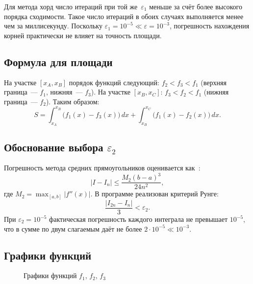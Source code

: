 \documentclass[a4paper,12pt,titlepage,finall]{article}
\begin{document}
Для метода хорд число итераций при той же~$\varepsilon_1$ меньше за счёт более
высокого порядка сходимости. Такое число итераций в обоих случаях выполняется
менее чем за миллисекунду. Поскольку $\varepsilon_1 = 10^{-5} \ll \varepsilon = 10^{-3}$,
погрешность нахождения корней практически не влияет на точность площади.

\subsection{Формула для площади}

На участке $[x_A, x_B]$ порядок функций следующий: $f_2 < f_3 < f_1$
(верхняя граница~--- $f_1$, нижняя~--- $f_3$). На участке $[x_B, x_C]$:
$f_3 < f_2 < f_1$ (нижняя граница~--- $f_2$). Таким образом:
\[
    S = \int_{x_A}^{x_B} \bigl(f_1(x) - f_3(x)\bigr)\,dx
      + \int_{x_B}^{x_C} \bigl(f_1(x) - f_2(x)\bigr)\,dx.
\]

\subsection{Обоснование выбора $\varepsilon_2$}

Погрешность метода средних прямоугольников оценивается как~\cite{math}:
\[
    |I - I_n| \leq \frac{M_2(b-a)^3}{24n^2},
\]
где $M_2 = \max_{[a,b]} |f''(x)|$. В программе реализован критерий Рунге:
\[
    \frac{|I_{2n} - I_n|}{3} < \varepsilon_2.
\]
При $\varepsilon_2 = 10^{-5}$ фактическая погрешность каждого интеграла
не превышает $10^{-5}$, что в сумме по двум слагаемым даёт не более
$2 \cdot 10^{-5} \ll 10^{-3}$.

\subsection{Графики функций}

\begin{figure}[h]
\centering
{}
\caption{Графики функций $f_1$, $f_2$, $f_3$}
\label{plot1}
\end{figure}
\end{document}
